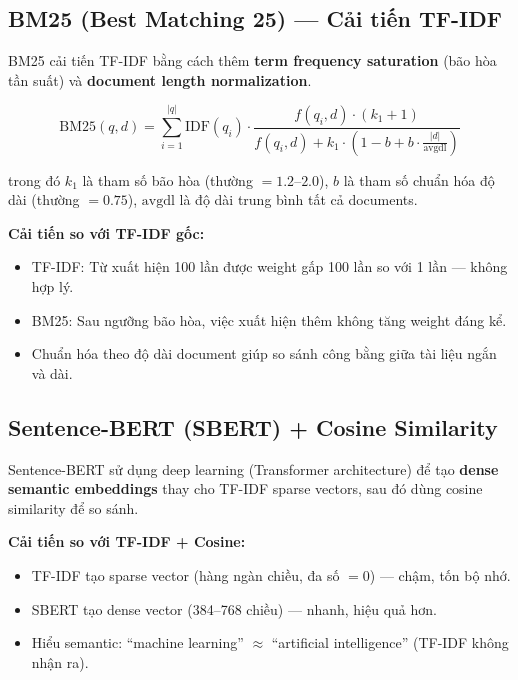 \documentclass[12pt,a4paper]{article}
\begin{document}
\subsection{BM25 (Best Matching 25) --- Cải tiến TF-IDF}

BM25 cải tiến TF-IDF bằng cách thêm \textbf{term frequency saturation} (bão hòa tần suất) và \textbf{document length normalization}.

\begin{equation}
\text{BM25}(q, d) = \sum_{i=1}^{|q|} \text{IDF}(q_i) \cdot \frac{f(q_i, d) \cdot (k_1 + 1)}{f(q_i, d) + k_1 \cdot \left(1 - b + b \cdot \frac{|d|}{\text{avgdl}}\right)}
\label{eq:bm25}
\end{equation}

trong đó $k_1$ là tham số bão hòa (thường $= 1.2$--$2.0$), $b$ là tham số chuẩn hóa độ dài (thường $= 0.75$), $\text{avgdl}$ là độ dài trung bình tất cả documents.

\noindent\textbf{Cải tiến so với TF-IDF gốc:}
\begin{itemize}[noitemsep]
    \item TF-IDF: Từ xuất hiện 100 lần được weight gấp 100 lần so với 1 lần --- không hợp lý.
    \item BM25: Sau ngưỡng bão hòa, việc xuất hiện thêm không tăng weight đáng kể.
    \item Chuẩn hóa theo độ dài document giúp so sánh công bằng giữa tài liệu ngắn và dài.
\end{itemize}

\subsection{Sentence-BERT (SBERT) + Cosine Similarity}

Sentence-BERT sử dụng deep learning (Transformer architecture) để tạo \textbf{dense semantic embeddings} thay cho TF-IDF sparse vectors, sau đó dùng cosine similarity để so sánh.

\noindent\textbf{Cải tiến so với TF-IDF + Cosine:}
\begin{itemize}[noitemsep]
    \item TF-IDF tạo sparse vector (hàng ngàn chiều, đa số $= 0$) --- chậm, tốn bộ nhớ.
    \item SBERT tạo dense vector (384--768 chiều) --- nhanh, hiệu quả hơn.
    \item Hiểu semantic: ``machine learning'' $\approx$ ``artificial intelligence'' (TF-IDF không nhận ra).
\end{itemize}
\end{document}

